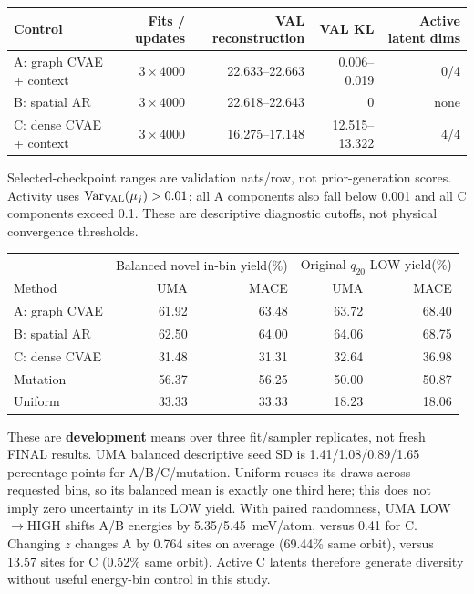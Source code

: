 \begin{center}\small
\begin{tabular}{lrrrr}\toprule
Control & Fits / updates & VAL reconstruction & VAL KL & Active latent dims\\\midrule
A: graph CVAE + context & $3\times 4000$ &22.633--22.663&0.006--0.019&0/4\\
B: spatial AR & $3\times 4000$ &22.618--22.643&0&none\\
C: dense CVAE + context & $3\times 4000$ &16.275--17.148&12.515--13.322&4/4\\\bottomrule
\end{tabular}
\end{center}
Selected-checkpoint ranges are validation nats/row, not prior-generation scores.
Activity uses $\operatorname{Var}_{\rm VAL}(\mu_j)>0.01$; all A components also
fall below 0.001 and all C components exceed 0.1. These are descriptive diagnostic
cutoffs, not physical convergence thresholds.
\begin{center}\small
\begin{tabular}{lrrrr}\toprule
&\multicolumn{2}{c}{Balanced novel in-bin yield(\%)}&\multicolumn{2}{c}{Original-$q_{20}$ LOW yield(\%)}\\
Method&UMA&MACE&UMA&MACE\\\midrule
A: graph CVAE&61.92&63.48&63.72&68.40\\
B: spatial AR&62.50&64.00&64.06&68.75\\
C: dense CVAE&31.48&31.31&32.64&36.98\\
Mutation&56.37&56.25&50.00&50.87\\
Uniform&33.33&33.33&18.23&18.06\\\bottomrule
\end{tabular}
\end{center}
These are \textbf{development} means over three fit/sampler replicates, not fresh
FINAL results. UMA balanced descriptive seed SD is 1.41/1.08/0.89/1.65 percentage
points for A/B/C/mutation. Uniform reuses its draws across requested bins, so its
balanced mean is exactly one third here; this does not imply zero uncertainty in
its LOW yield. With paired randomness, UMA LOW$\to$HIGH shifts A/B energies by
5.35/5.45~meV/atom, versus 0.41 for C. Changing $z$ changes A by 0.764 sites on average
(69.44\% same orbit), versus 13.57 sites for C (0.52\% same orbit). Active C latents
therefore generate diversity without useful energy-bin control in this study.
